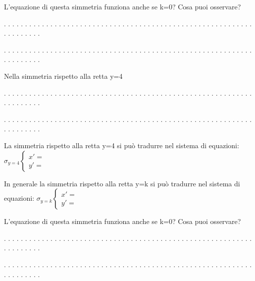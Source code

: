 L'equazione di questa simmetria funziona anche se k=0? Cosa puoi osservare?

. . . . . . . . . . . . . . . . . . . . . . . . . . . . . . . . . . . . . . . .
. . . . . . . . . . . . . . . . . . . . . . . . . . . .

. . . . . . . . . . . . . . . . . . . . . . . . . . . . . . . . . . . . . . . .
. . . . . . . . . . . . . . . . . . . . . . . . . . . .

Nella simmetria rispetto alla retta y=4

. . . . . . . . . . . . . . . . . . . . . . . . . . . . . . . . . . . . . . . .
. . . . . . . . . . . . . . . . . . . . . . . . . . . .

. . . . . . . . . . . . . . . . . . . . . . . . . . . . . . . . . . . . . . . .
. . . . . . . . . . . . . . . . . . . . . . . . . . . .

La simmetria rispetto alla retta y=4 si può tradurre nel sistema di equazioni:
\(\sigma_{y = 4} \left \{
\begin{array}{l}
x' = {} \\
y' = {}
\end{array} \right .\)

In generale la simmetria rispetto alla retta y=k si può tradurre nel sistema
di equazioni:
\(\sigma_{y = k} \left \{
\begin{array}{l}
x' = {} \\
y' = {}
\end{array} \right .\)

L'equazione di questa simmetria funziona anche se k=0? Cosa puoi osservare?

. . . . . . . . . . . . . . . . . . . . . . . . . . . . . . . . . . . . . . . .
. . . . . . . . . . . . . . . . . . . . . . . . . . . .

. . . . . . . . . . . . . . . . . . . . . . . . . . . . . . . . . . . . . . . .
. . . . . . . . . . . . . . . . . . . . . . . . . . . .


